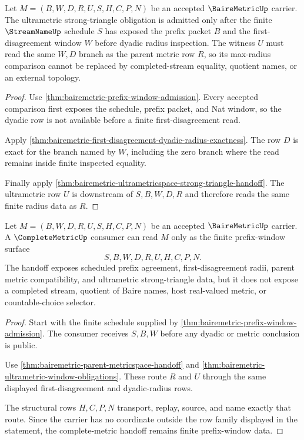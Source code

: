 \begin{theorem}
\label{thm:bairemetric-ultrametric-window-obligations}
Let $M=(B,W,D,R,U,S,H,C,P,N)$ be an accepted $\BaireMetricUp$ carrier. The ultrametric strong-triangle obligation is admitted only after the finite $\StreamNameUp$ schedule $S$ has exposed the prefix packet $B$ and the first-disagreement window $W$ before dyadic radius inspection. The witness $U$ must read the same $W,D$ branch as the parent metric row $R$, so its max-radius comparison cannot be replaced by completed-stream equality, quotient names, or an external topology.
\end{theorem}
\begin{proof}
Use \autoref{thm:bairemetric-prefix-window-admission}. Every accepted comparison first exposes the schedule, prefix packet, and Nat window, so the dyadic row is not available before a finite first-disagreement read.

Apply \autoref{thm:bairemetric-first-disagreement-dyadic-radius-exactness}. The row $D$ is exact for the branch named by $W$, including the zero branch where the read remains inside finite inspected equality.

Finally apply \autoref{thm:bairemetric-ultrametricspace-strong-triangle-handoff}. The ultrametric row $U$ is downstream of $S,B,W,D,R$ and therefore reads the same finite radius data as $R$.
\end{proof}

\begin{theorem}
\label{thm:bairemetric-complete-metric-handoff}
Let $M=(B,W,D,R,U,S,H,C,P,N)$ be an accepted $\BaireMetricUp$ carrier. A $\CompleteMetricUp$ consumer can read $M$ only as the finite prefix-window surface
$$
S,B,W,D,R,U,H,C,P,N .
$$
The handoff exposes scheduled prefix agreement, first-disagreement radii, parent metric compatibility, and ultrametric strong-triangle data, but it does not expose a completed stream, quotient of Baire names, host real-valued metric, or countable-choice selector.
\end{theorem}
\begin{proof}
Start with the finite schedule supplied by \autoref{thm:bairemetric-prefix-window-admission}. The consumer receives $S,B,W$ before any dyadic or metric conclusion is public.

Use \autoref{thm:bairemetric-parent-metricspace-handoff} and \autoref{thm:bairemetric-ultrametric-window-obligations}. These route $R$ and $U$ through the same displayed first-disagreement and dyadic-radius rows.

The structural rows $H,C,P,N$ transport, replay, source, and name exactly that route. Since the carrier has no coordinate outside the row family displayed in the statement, the complete-metric handoff remains finite prefix-window data.
\end{proof}


